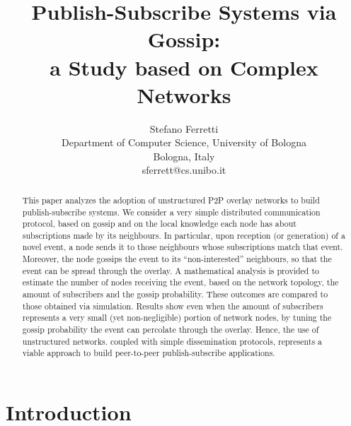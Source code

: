 \documentclass[10pt, conference, compsocconf]{IEEEtran}
\begin{document}
\title{Publish-Subscribe Systems via Gossip:\\ a Study based on Complex Networks}


\author{
Stefano Ferretti\\
Department of Computer Science, University of Bologna\\
Bologna, Italy\\
sferrett@cs.unibo.it
}





\maketitle              
\begin{abstract}
This paper analyzes the adoption of unstructured P2P overlay networks to build publish-subscribe systems. We consider a very simple distributed communication protocol, ba\-sed on gossip and on the local knowledge each node has about subscriptions made by its neighbours. In particular, upon reception (or generation) of a novel event, a node sends it to those neighbours whose subscriptions match that event. Moreover, the node gossips the event to its ``non-interested'' neighbours, so that the event can be spread through the overlay. A mathematical analysis is provided to estimate the number of nodes receiving the event, based on the network topology, the amount of subscribers and the gossip probability. These outcomes are compared to those obtained via simulation. Results show even when the amount of subscribers represents a very small (yet non-negligible) portion of network nodes, by tuning the gossip probability the event can percolate through the overlay. Hence, the use of unstructured networks. coupled with simple dissemination protocols, represents a viable approach to build peer-to-peer publish-subscribe applications.
\end{abstract}


\section{Introduction}
\end{document}
